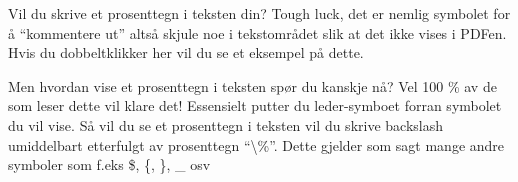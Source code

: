         Vil du skrive et prosenttegn i teksten din? Tough luck, det er nemlig symbolet for å ``kommentere ut'' altså skjule noe i tekstområdet slik at det ikke vises i PDFen. Hvis du dobbeltklikker her vil du se et eksempel på dette.

        Men hvordan vise et prosenttegn i teksten spør du kanskje nå? Vel 100 \% av de som leser dette vil klare det!
        Essensielt putter du leder-symboet forran symbolet du vil vise. Så vil du se et prosenttegn i teksten vil du skrive backslash umiddelbart etterfulgt av prosenttegn ``\textbackslash\%''.
        Dette gjelder som sagt mange andre symboler som f.eks \$, \{, \}, \_ osv
        
